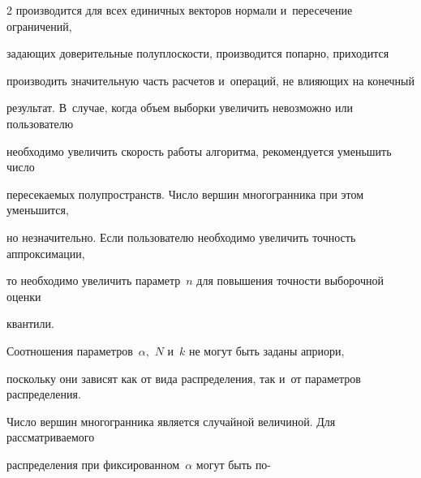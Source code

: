 \begin{multicols}{2}
производится для всех единичных векторов нормали и~пересечение ограничений, 

задающих доверительные по\-лу\-плос\-кости, производится попарно, приходится 

производить значительную часть расчетов и~операций, не влия\-ющих на конечный 

результат. В~случае, когда объем выборки увеличить невозможно или пользователю 

необходимо увеличить ско\-рость работы алгоритма, рекомендуется уменьшить чис\-ло 

пересекаемых полупространств. Чис\-ло вершин многогранника при этом уменьшится, 

но незначительно. Если пользователю необходимо увеличить точ\-ность аппроксимации, 

то необходимо увеличить па\-ра\-метр~$n$ для повышения точ\-ности выборочной оценки 

кван\-тили.







Соотношения параметров~$\alpha,$ $N$ и~$k$ не могут быть заданы априори, 

поскольку они зависят как от вида распределения, так и~от параметров распределения. 

Число вершин многогранника является случайной величиной. Для рас\-смат\-ри\-ва\-емо\-го 

распределения при фиксированном~$\alpha$ могут быть по-\linebreak\vspace*{-12pt}



\pagebreak



\end{multicols}



